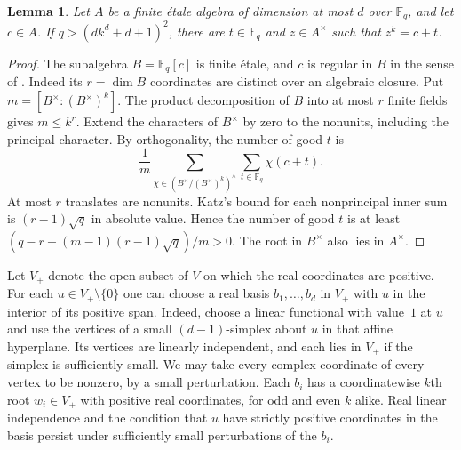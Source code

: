 \documentclass[11pt,letterpaper]{article}
\newtheorem{lemma}[lemma]{Lemma}
\theoremstyle{definition}
\numberwithin{equation}{section}
\begin{document}
\begin{lemma}\label{lem:htranslate}
Let $A$ be a finite \emph{\'etale} algebra of dimension at most $d$ over
$\mathbb F_q$, and let $c\in A$. If $q>(d k^d+d+1)^2$, there are
$t\in\mathbb F_q$ and $z\in A^\times$ such that
$z^k=c+t$.
\end{lemma}
\begin{proof}
The subalgebra $B=\mathbb F_q[c]$ is finite \'etale, and $c$ is regular
in $B$ in the sense of \cite[Theorem~2]{hkatz}. Indeed its
$r=\dim B$ coordinates are distinct over an algebraic closure. Put
$m=[B^\times:(B^\times)^k]$. The product decomposition of $B$ into at
most $r$ finite fields gives $m\le k^r$. Extend the characters of
$B^\times$ by zero to the nonunits, including the principal character.
By orthogonality, the number of good $t$ is
\[
 \frac{1}{m}\sum_{\chi\in(B^\times/(B^\times)^k)^\wedge}
                   \sum_{t\in\mathbb F_q}\chi(c+t).
\]
At most $r$ translates are nonunits. Katz's bound for each nonprincipal
inner sum is $(r-1)\sqrt q$ in absolute value. Hence the number of good
$t$ is at least $(q-r-(m-1)(r-1)\sqrt q)/m>0$. The root in $B^\times$
also lies in $A^\times$.
\end{proof}

Let $V_+$ denote the open subset of $V$ on which the real coordinates
are positive. For each $u\in V_+\setminus\{0\}$ one can choose a real
basis $b_1,\dots,b_d$ in $V_+$ with $u$ in the interior of its positive
span. Indeed, choose a linear functional with value~$1$ at $u$ and
use the vertices of a small $(d-1)$-simplex about $u$ in that
affine hyperplane. Its vertices are linearly independent, and each
lies in $V_+$ if the simplex is sufficiently small. We may take
every complex coordinate of every vertex to be nonzero, by a small
perturbation. Each $b_i$ has a coordinatewise $k$th root $w_i\in V_+$
with positive real coordinates, for odd and even $k$ alike.
Real linear independence and the condition that $u$ have strictly
positive coordinates in the basis persist under sufficiently small
perturbations of the $b_i$.
\end{document}
